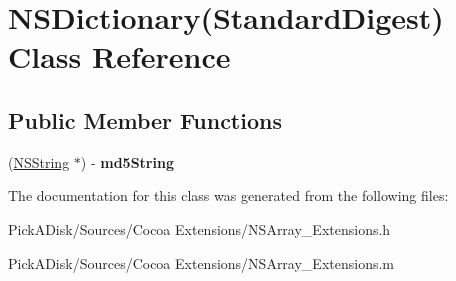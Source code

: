 \hypertarget{interface_n_s_dictionary_07_standard_digest_08}{
\section{NSDictionary(StandardDigest) Class Reference}
\label{interface_n_s_dictionary_07_standard_digest_08}
}
\subsection*{Public Member Functions}
\begin{DoxyCompactItemize}
\item 
\hypertarget{interface_n_s_dictionary_07_standard_digest_08_af31733aa47e2c71810ed522e76f692de}{
(\hyperlink{class_n_s_string}{NSString} $\ast$) -\/ {\bfseries md5String}}
\label{interface_n_s_dictionary_07_standard_digest_08_af31733aa47e2c71810ed522e76f692de}

\end{DoxyCompactItemize}


The documentation for this class was generated from the following files:\begin{DoxyCompactItemize}
\item 
PickADisk/Sources/Cocoa Extensions/NSArray\_\-Extensions.h\item 
PickADisk/Sources/Cocoa Extensions/NSArray\_\-Extensions.m\end{DoxyCompactItemize}
